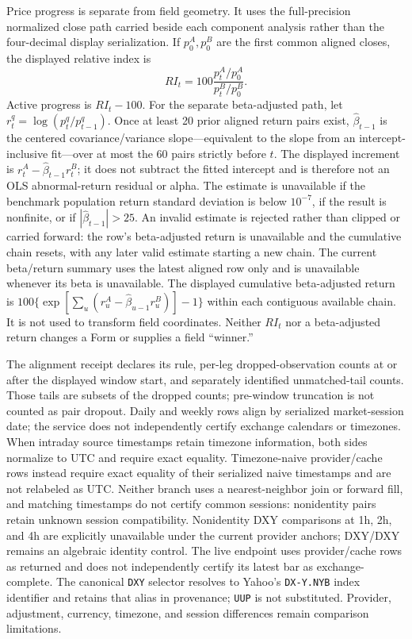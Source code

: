 \documentclass{article}
\begin{document}
Price progress is separate from field geometry. It uses the full-precision normalized close path carried beside each component analysis rather than the four-decimal display serialization. If $p^A_0,p^B_0$ are the first common aligned closes, the displayed relative index is
\begin{equation}
    RI_t=100\frac{p^A_t/p^A_0}{p^B_t/p^B_0}.
\end{equation}
Active progress is $RI_t-100$. For the separate beta-adjusted path, let $r^q_t=\log(p^q_t/p^q_{t-1})$. Once at least 20 prior aligned return pairs exist, $\widehat\beta_{t-1}$ is the centered covariance/variance slope---equivalent to the slope from an intercept-inclusive fit---over at most the 60 pairs strictly before $t$. The displayed increment is $r^A_t-\widehat\beta_{t-1}r^B_t$; it does not subtract the fitted intercept and is therefore not an OLS abnormal-return residual or alpha. The estimate is unavailable if the benchmark population return standard deviation is below $10^{-7}$, if the result is nonfinite, or if $|\widehat\beta_{t-1}|>25$. An invalid estimate is rejected rather than clipped or carried forward: the row's beta-adjusted return is unavailable and the cumulative chain resets, with any later valid estimate starting a new chain. The current beta/return summary uses the latest aligned row only and is unavailable whenever its beta is unavailable. The displayed cumulative beta-adjusted return is $100\{\exp[\sum_u(r^A_u-\widehat\beta_{u-1}r^B_u)]-1\}$ within each contiguous available chain. It is not used to transform field coordinates. Neither $RI_t$ nor a beta-adjusted return changes a Form or supplies a field ``winner.''

The alignment receipt declares its rule, per-leg dropped-observation counts at or after the displayed window start, and separately identified unmatched-tail counts. Those tails are subsets of the dropped counts; pre-window truncation is not counted as pair dropout. Daily and weekly rows align by serialized market-session date; the service does not independently certify exchange calendars or timezones. When intraday source timestamps retain timezone information, both sides normalize to UTC and require exact equality. Timezone-naive provider/cache rows instead require exact equality of their serialized naive timestamps and are not relabeled as UTC. Neither branch uses a nearest-neighbor join or forward fill, and matching timestamps do not certify common sessions: nonidentity pairs retain unknown session compatibility. Nonidentity DXY comparisons at 1h, 2h, and 4h are explicitly unavailable under the current provider anchors; DXY/DXY remains an algebraic identity control. The live endpoint uses provider/cache rows as returned and does not independently certify its latest bar as exchange-complete. The canonical \texttt{DXY} selector resolves to Yahoo's \texttt{DX-Y.NYB} index identifier and retains that alias in provenance; \texttt{UUP} is not substituted. Provider, adjustment, currency, timezone, and session differences remain comparison limitations.
\end{document}
